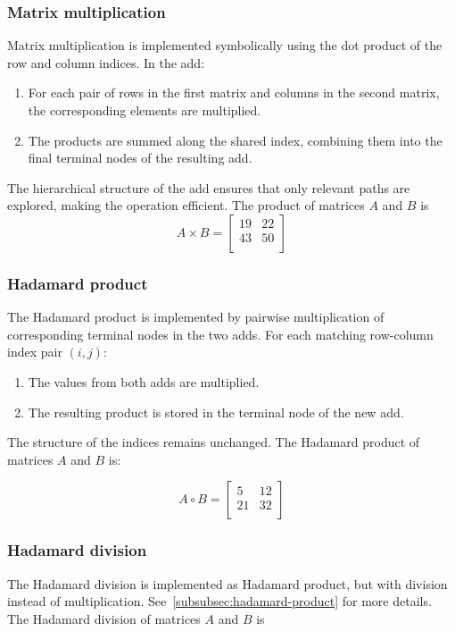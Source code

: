 \subsubsection{Matrix multiplication}
Matrix multiplication is implemented symbolically using the dot product of the row and column indices. In the \gls{add}:
\begin{enumerate}
    \item For each pair of rows in the first matrix and columns in the second matrix, the corresponding elements are multiplied.
    \item The products are summed along the shared index, combining them into the final terminal nodes of the resulting \gls{add}.
\end{enumerate}
The hierarchical structure of the \gls{add} ensures that only relevant paths are explored, making the operation efficient.
The product of matrices $A$ and $B$ is
\[
    A \times B = \begin{bmatrix}
        19 & 22 \\
        43 & 50 \\
    \end{bmatrix}
\]

\subsubsection{Hadamard product}\label{subsubsec:hadamard-product}
The Hadamard product is implemented by pairwise multiplication of corresponding terminal nodes in the two \glspl{add}. For each matching row-column index pair $(i, j)$:
\begin{enumerate}
    \item The values from both \glspl{add} are multiplied.
    \item The resulting product is stored in the terminal node of the new \gls{add}.
\end{enumerate}
The structure of the indices remains unchanged.
The Hadamard product of matrices $A$ and $B$ is:

\[
    A \circ B = \begin{bmatrix}
        5  & 12 \\
        21 & 32 \\
    \end{bmatrix}
\]

\subsubsection{Hadamard division}
The Hadamard division is implemented as Hadamard product, but with division instead of multiplication. See~\autoref{subsubsec:hadamard-product} for more details.
The Hadamard division of matrices $A$ and $B$ is

